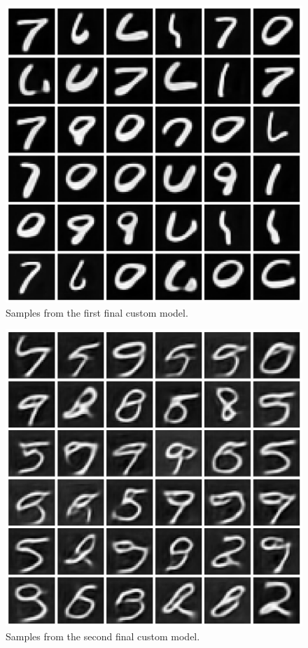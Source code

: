 \documentclass[12pt]{article}
\begin{document}
\begin{figure}[hp]
    \includegraphics[scale=0.2, center]{figures/samples_9.png}
    \caption{Samples from the first final custom model.}
    \label{fig:samples_9}
\end{figure}

\begin{figure}[hp]
    \includegraphics[scale=0.2, center]{figures/samples_10.png}
    \caption{Samples from the second final custom model.}
    \label{fig:samples_10}
\end{figure}
\end{document}
